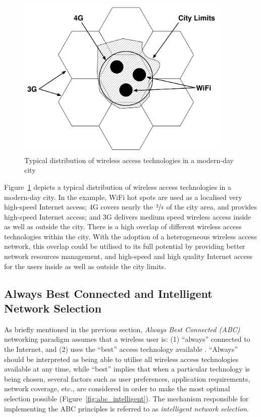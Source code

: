 \begin{figure}[t]
    \centering
    \includegraphics[width=4in]{Intelligent/Figures/wireless_city}
    \caption{Typical distribution of wireless access technologies in a modern-day city}
    \label{fig:wireless_city_intelligent}
\end{figure}

Figure~\ref{fig:wireless_city_intelligent} depicts a typical distribution of wireless access technologies in a modern-day city. In the example, WiFi hot spots are used as a localised very high-speed Internet access; 4G covers nearly the $\sfrac{3}{4}$ of the city area, and provides high-speed Internet access; and 3G delivers medium speed wireless access inside as well as outside the city. There is a high overlap of different wireless access technologies within the city. With the adoption of a heterogeneous wireless access network, this overlap could be utilised to its full potential by providing better network resources management, and high-speed and high quality Internet access for the users inside as well as outside the city limits.

\subsection{Always Best Connected and Intelligent Network Selection} %
\label{sub:always_best_connected_and_intelligent_network_selection_intelligent}
As briefly mentioned in the previous section, \emph{Always Best Connected (ABC)} networking paradigm assumes that a wireless user is: (1) ``always'' connected to the Internet, and (2) uses the ``best'' access technology available \cite{ABC03}. ``Always'' should be interpreted as being able to utilise all wireless access technologies available at any time, while ``best'' implies that when a particular technology is being chosen, several factors such as user preferences, application requirements, network coverage, etc., are considered in order to make the most optimal selection possible (Figure~\ref{fig:abc_intelligent}). The mechanism responsible for implementing the ABC principles is referred to as \emph{intelligent network selection}.

